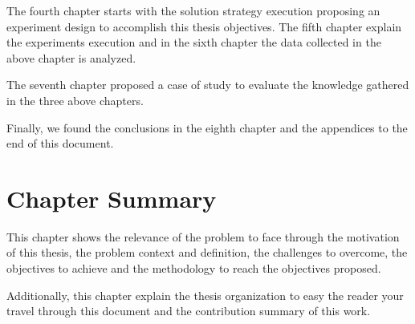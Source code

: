  The fourth chapter starts with the solution strategy execution proposing an experiment design to accomplish this thesis objectives. The fifth chapter explain the experiments execution and in the sixth chapter the data collected in the above chapter is analyzed. 
 
 The seventh chapter proposed a case of study to evaluate the knowledge gathered in the three above chapters.
 
 Finally, we found the conclusions in the eighth chapter and the appendices to the end of this document.

\section{Chapter Summary}
This chapter shows the relevance of the problem to face through the motivation of this thesis, the problem context and definition, the challenges to overcome, the objectives to achieve and the methodology to reach the objectives proposed. 

Additionally, this chapter explain the thesis organization to easy the reader your travel through this document and the contribution summary of this work.